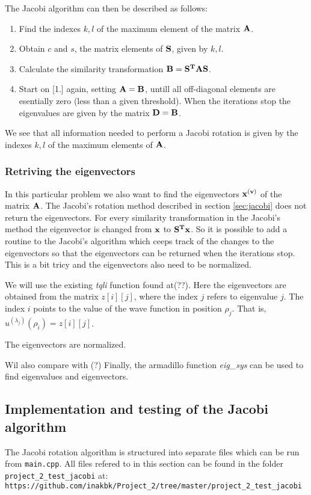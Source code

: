 \documentclass[11pt,a4wide]{article}
\begin{document}
The Jacobi algorithm can then be described as follows: 
\begin{enumerate}
\item Find the indexes $k, l$ of the maximum element of the matrix $\bf A$.
\item Obtain $c$ and $s$, the matrix elements of $\bf S$, given by $k, l$.
\item Calculate the similarity transformation $\bf{B = S^TAS}$.
\item Start on [1.] again, setting $\bf {A = B}$, untill all off-diagonal elements are esentially zero (less than a given threshold). When the iterations stop the eigenvalues are given by the matrix $\bf {D = B}$.
\end{enumerate}

We see that all information needed to perform a Jacobi rotation is given by the indexes $k, l$ of the maximum elements of $\bf A$.

\subsubsection*{Retriving the eigenvectors}
In this particular problem we also want to find the eigenvectors $\bf x^{(v)}$ of the matrix $\bf A$. The Jacobi's rotation method described in section \ref{sec:jacobi} does not return the eigenvectors. For every similarity transformation in the Jacobi's method the eigenvector is changed from $\bf x$ to $\bf{S^Tx}$. So it is possible to add a routine to the Jacobi's algorithm which ceeps track of the changes to the eigenvectors so that the eigenvectors can be returned when the iterations stop. This is a bit tricy and the eigenvectors also need to be normalized.

We will use the existing {\em tqli} function found at(??). Here the eigenvectors are obtained from the matrix $z[i][j]$, where the index $j$ refers to eigenvalue $j$. The index $i$ points to the value of the wave function in position $\rho_j$. That is,  $u^{(\lambda_j)}(\rho_i)=z[i][j]$.   

The eigenvectors are normalized. 

Wil also compare with (?)
Finally, the armadillo function {\em eig\_sys} can be used to find eigenvalues and eigenvectors.

\subsection{Implementation and testing of the Jacobi algorithm}
The Jacobi rotation algorithm is structured into separate files which can be run from \texttt{main.cpp}. All files refered to in this section can be found in the folder \texttt{project\_2\_test\_jacobi} at: \\
\texttt{https://github.com/inakbk/Project\_2/tree/master/project\_2\_test\_jacobi}
\end{document}
